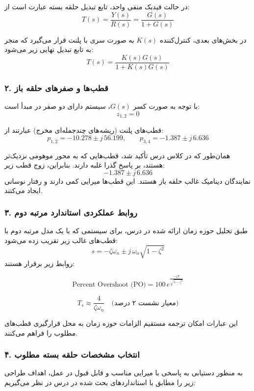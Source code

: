 \documentclass[a4paper]{article}
\begin{document}
در حالت فیدبک منفی واحد، تابع تبدیل حلقه بسته عبارت است از:
\[
T(s)=\frac{Y(s)}{R(s)}=\frac{G(s)}{1+G(s)}
\]

در بخش‌های بعدی، کنترل‌کننده $K(s)$ به صورت سری با پلنت قرار می‌گیرد که منجر به تابع تبدیل نهایی زیر می‌شود:
\[
T(s)=\frac{K(s)G(s)}{1+K(s)G(s)}
\]

\subsubsection*{۲. قطب‌ها و صفرهای حلقه باز}

با توجه به صورت کسر $G(s)$، سیستم دارای دو صفر در مبدأ است:
\[
z_{1,2}=0
\]

قطب‌های پلنت (ریشه‌های چندجمله‌ای مخرج) عبارتند از:
\[
p_{1,2}=-10.278\pm j\,56.199, \qquad p_{3,4}=-1.387\pm j\,6.636
\]

همان‌طور که در کلاس درس تأکید شد، قطب‌هایی که به محور موهومی نزدیک‌تر هستند، بر پاسخ گذرا غلبه دارند. بنابراین، زوج قطب زیر:
\[
-1.387 \pm j\,6.636
\]
نمایندگان دینامیک غالب حلقه باز هستند. این قطب‌ها میرایی کمی دارند و رفتار نوسانی ایجاد می‌کنند.

\subsubsection*{۳. روابط عملکردی استاندارد مرتبه دوم}

طبق تحلیل حوزه زمان ارائه شده در درس، برای سیستمی که با یک مدل مرتبه دوم با قطب‌های غالب زیر تقریب زده می‌شود:
\[
s = -\zeta \omega_n \pm j\,\omega_n\sqrt{1-\zeta^2}
\]
روابط زیر برقرار هستند:

\[
\text{Percent Overshoot (PO)} = 100\, e^{\frac{-\zeta \pi}{\sqrt{1-\zeta^2}}}
\]

\[
T_s \approx \frac{4}{\zeta \omega_n} \quad \text{(معیار نشست ۲ درصد)}
\]

این عبارات امکان ترجمه مستقیم الزامات حوزه زمان به محل قرارگیری قطب‌های مطلوب را فراهم می‌کنند.

\subsubsection*{۴. انتخاب مشخصات حلقه بسته مطلوب}

به منظور دستیابی به پاسخی با میرایی مناسب و قابل قبول در عمل، اهداف طراحی زیر را مطابق با استانداردهای بحث شده در درس در نظر می‌گیریم:
\end{document}
